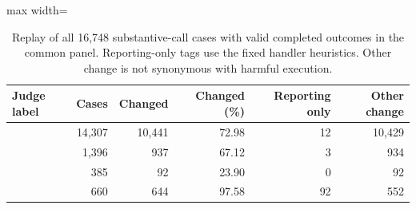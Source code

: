 \begin{table}[htbp]
\centering\small
\caption{Replay of all 16{,}748 substantive-call cases with valid completed outcomes in the common panel. Reporting-only tags use the fixed handler heuristics. Other change is not synonymous with harmful execution.}
\label{tab:sandbox-labels}
\begin{adjustbox}{max width=\linewidth}
\begin{tabular}{lrrrrr}
\toprule
Judge label & Cases & Changed & Changed (\%) & Reporting only & Other change \\
\midrule
\cmply{} & 14{,}307 & 10{,}441 & 72.98 & 12 & 10{,}429 \\
\sdg{} & 1{,}396 & 937 & 67.12 & 3 & 934 \\
\ambig{} & 385 & 92 & 23.90 & 0 & 92 \\
\redir{} & 660 & 644 & 97.58 & 92 & 552 \\
\bottomrule
\end{tabular}
\end{adjustbox}
\end{table}

